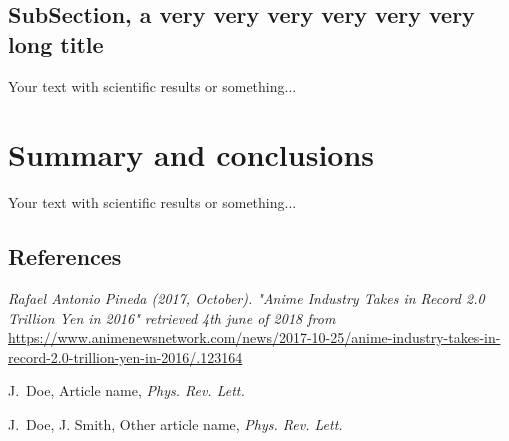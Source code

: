 \documentclass[final]{beamer}
\begin{document}
\begin{frame}[t]
\begin{multicols}{3}
\subsection{SubSection, a very very very very very very long title}
Your text with scientific results or something...

\section{Summary and conclusions}
Your text with scientific results or something...




\subsection{References}

\begin{thebibliography}{99}

 \textit{Rafael Antonio Pineda (2017, October). "Anime Industry Takes in Record 2.0 Trillion Yen in 2016" retrieved 4th june of 2018 from} \url{https://www.animenewsnetwork.com/news/2017-10-25/anime-industry-takes-in-record-2.0-trillion-yen-in-2016/.123164}

 J.~Doe, Article name, \textit{Phys. Rev. Lett.}

 J.~Doe, J. Smith, Other article name, \textit{Phys. Rev. Lett.}


\end{thebibliography}

\end{multicols}

\end{frame}
\end{document}
